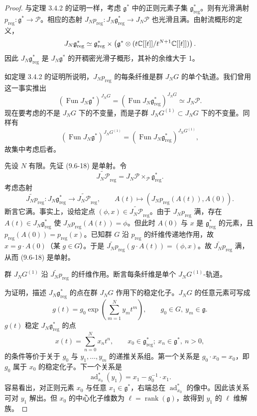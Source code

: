 \begin{proof}
    与定理 3.4.2 的证明一样，考虑 $\mathfrak{g}^*$ 中的正则元素子集 $\mathfrak{g}^*_{\mathrm{reg}}$。则有光滑满射 $p_{\mathrm{reg}}:\mathfrak{g}^*\to\mathcal{P}$。相应的态射 $J_Np_{\mathrm{reg}}:J_N\mathfrak{g}^*_{\mathrm{reg}}\to J_N\mathcal{P}$ 也光滑且满。由射流概形的定义，
    \[
        J_N\mathfrak{g}^*_{\mathrm{reg}}
        \simeq\mathfrak{g}^*_{\mathrm{reg}}\times\left(\mathfrak{g}^*\otimes(t\mathbb{C}[[t]]/t^{N+1}\mathbb{C}[[t]])\right).
    \]
    因此 $J_N\mathfrak{g}^*_{\mathrm{reg}}$ 是 $J_N\mathfrak{g}^*$ 的开稠密光滑子概形，其补的余维大于 1。

    如定理 3.4.2 的证明所说明，$J_Np_{\mathrm{reg}}$ 的每条纤维是群 $J_NG$ 的单个轨道。我们曾用这一事实推出
    \[
        (\operatorname{Fun}J_N\mathfrak{g}^*)^{J_NG}
        =(\operatorname{Fun}J_N\mathfrak{g}^*_{\mathrm{reg}})^{J_NG}\simeq J_N\mathcal{P}.
    \]
    现在要考虑的不是 $J_NG$ 下的不变量，而是子群 $J_NG^{(1)}\subset J_NG$ 下的不变量。同样有
    \[
        (\operatorname{Fun}J_N\mathfrak{g}^*)^{J_NG^{(1)}}
        =(\operatorname{Fun}J_N\mathfrak{g}^*_{\mathrm{reg}})^{J_NG^{(1)}},
    \]
    故集中考虑后者。

    先设 $N$ 有限。先证 (9.6-18) 是单射。令
    \[
        \widetilde{J_N\mathcal{P}}_{\mathrm{reg}}=J_N\mathcal{P}\times_{\mathcal{P}}\mathfrak{g}^*_{\mathrm{reg}}.
    \]
    考虑态射
    \[
        \widetilde{J_Np}_{\mathrm{reg}}:J_N\mathfrak{g}^*_{\mathrm{reg}}\to\widetilde{J_N\mathcal{P}}_{\mathrm{reg}},
        \qquad
        A(t)\mapsto(J_Np_{\mathrm{reg}}(A(t)),A(0)).
    \]
    断言它满。事实上，设给定点 $(\phi,x)\in\widetilde{J_N\mathcal{P}}_{\mathrm{reg}}$。由于 $J_Np_{\mathrm{reg}}$ 满，存在 $A(t)\in J_N\mathfrak{g}^*_{\mathrm{reg}}$ 使 $J_Np_{\mathrm{reg}}(A(t))=\phi$。但此时 $A(0)$ 与 $x$ 是 $\mathfrak{g}^*_{\mathrm{reg}}$ 的元素，且 $p_{\mathrm{reg}}(A(0))=p_{\mathrm{reg}}(x)$。已知群 $G$ 沿 $p_{\mathrm{reg}}$ 的纤维传递地作用，故 $x=g\cdot A(0)$（某 $g\in G$）。于是 $\widetilde{J_Np}_{\mathrm{reg}}(g\cdot A(t))=(\phi,x)$。故 $\widetilde{J_Np}_{\mathrm{reg}}$ 满，从而 (9.6-18) 是单射。

    群 $J_NG^{(1)}$ 沿 $\widetilde{J_Np}_{\mathrm{reg}}$ 的纤维作用。断言每条纤维是单个 $J_NG^{(1)}$-轨道。

    为证明，描述 $J_N\mathfrak{g}^*_{\mathrm{reg}}$ 的点在群 $J_NG$ 作用下的稳定化子。$J_NG$ 的任意元素可写成
    \[
        g(t)=g_0\exp\left(\sum_{m=1}^{N}y_mt^m\right),
        \qquad g_0\in G,\ y_m\in\mathfrak{g}.
    \]
    $g(t)$ 稳定 $J_N\mathfrak{g}^*_{\mathrm{reg}}$ 的点
    \[
        x(t)=\sum_{n=0}^{N}x_nt^n,
        \qquad x_0\in\mathfrak{g}^*_{\mathrm{reg}};\ x_n\in\mathfrak{g}^*,\ n>0,
    \]
    的条件等价于关于 $g_0$ 与 $y_1,\dots,y_m$ 的递推关系组。第一个关系是 $g_0\cdot x_0=x_0$，即 $g_0$ 属于 $x_0$ 的稳定化子。下一个关系是
    \[
        \operatorname{ad}^*_{x_0}(y_1)=x_1-g_0^{-1}\cdot x_1.
    \]
    容易看出，对正则元素 $x_0$ 与任意 $x_1\in\mathfrak{g}^*$，右端总在 $\operatorname{ad}^*_{x_0}$ 的像中。因此该关系可对 $y_1$ 解出。但 $x_0$ 的中心化子维数为 $\ell=\operatorname{rank}(\mathfrak{g})$，故得到 $y_1$ 的 $\ell$ 维解族。


\end{proof}
